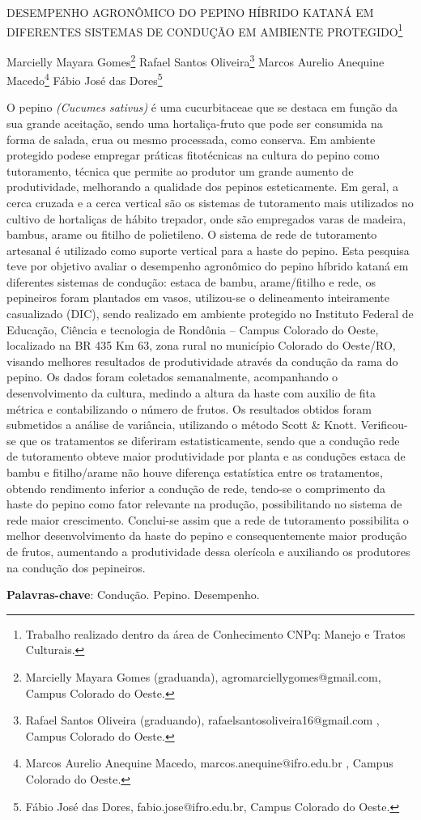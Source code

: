 \documentclass[article,12pt,onesidea,4paper,english,brazil]{abntex2}
\begin{document}
	
	
	\frenchspacing 
	
	\begin{center}
		\LARGE DESEMPENHO AGRONÔMICO DO PEPINO HÍBRIDO KATANÁ EM DIFERENTES
		SISTEMAS DE CONDUÇÃO EM AMBIENTE PROTEGIDO\footnote{Trabalho realizado dentro da área de Conhecimento CNPq: Manejo e Tratos Culturais.}
		
		\normalsize
	Marcielly Mayara Gomes\footnote{Marcielly Mayara Gomes (graduanda), agromarciellygomes@gmail.com, Campus Colorado do
		Oeste.} 
		Rafael Santos Oliveira\footnote{Rafael Santos Oliveira (graduando), rafaelsantosoliveira16@gmail.com , Campus Colorado do
			Oeste.} 
		Marcos Aurelio Anequine Macedo\footnote{Marcos Aurelio Anequine Macedo, marcos.anequine@ifro.edu.br , Campus Colorado do Oeste.} 
		Fábio José das Dores\footnote{Fábio José das Dores, fabio.jose@ifro.edu.br, Campus Colorado do Oeste.} 
	\end{center}
	
	\noindent
	 O pepino \textit{(Cucumes sativus)} é uma cucurbitaceae que se destaca em função da sua
	grande aceitação, sendo uma hortaliça-fruto que pode ser consumida na forma de
	salada, crua ou mesmo processada, como conserva. Em ambiente protegido podese
	empregar práticas fitotécnicas na cultura do pepino como tutoramento, técnica
	que permite ao produtor um grande aumento de produtividade, melhorando a
	qualidade dos pepinos esteticamente. Em geral, a cerca cruzada e a cerca vertical
	são os sistemas de tutoramento mais utilizados no cultivo de hortaliças de hábito
	trepador, onde são empregados varas de madeira, bambus, arame ou fitilho de
	polietileno. O sistema de rede de tutoramento artesanal é utilizado como suporte
	vertical para a haste do pepino. Esta pesquisa teve por objetivo avaliar o
	desempenho agronômico do pepino híbrido kataná em diferentes sistemas de
	condução: estaca de bambu, arame/fitilho e rede, os pepineiros foram plantados em
	vasos, utilizou-se o delineamento inteiramente casualizado (DIC), sendo realizado
	em ambiente protegido no Instituto Federal de Educação, Ciência e tecnologia de
	Rondônia – Campus Colorado do Oeste, localizado na BR 435 Km 63, zona rural no
	município Colorado do Oeste/RO, visando melhores resultados de produtividade
	através da condução da rama do pepino. Os dados foram coletados semanalmente,
	acompanhando o desenvolvimento da cultura, medindo a altura da haste com auxilio
	de fita métrica e contabilizando o número de frutos. Os resultados obtidos foram
	submetidos a análise de variância, utilizando o método Scott \& Knott. Verificou-se
	que os tratamentos se diferiram estatisticamente, sendo que a condução rede de
	tutoramento obteve maior produtividade por planta e as conduções estaca de bambu
	e fitilho/arame não houve diferença estatística entre os tratamentos, obtendo
	rendimento inferior a condução de rede, tendo-se o comprimento da haste do pepino
	como fator relevante na produção, possibilitando no sistema de rede maior
	crescimento. Conclui-se assim que a rede de tutoramento possibilita o melhor
	desenvolvimento da haste do pepino e consequentemente maior produção de frutos,
	aumentando a produtividade dessa olerícola e auxiliando os produtores na condução
	dos pepineiros.
	
	\vspace{\onelineskip}
	
	\noindent
	\textbf{Palavras-chave}: Condução. Pepino. Desempenho.
	
\end{document}
